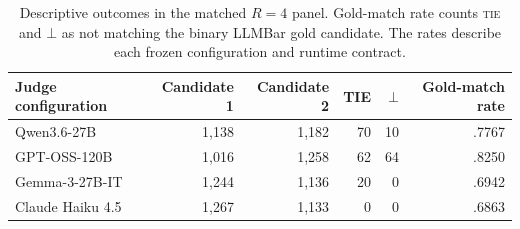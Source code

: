 \begin{table}[t]
\centering
\small
\setlength{\tabcolsep}{5pt}
\begin{tabular}{lrrrrr}
\toprule
Judge configuration & Candidate 1 & Candidate 2 & TIE & $\bot$ & Gold-match rate \\
\midrule
Qwen3.6-27B      & 1,138 & 1,182 & 70 & 10 & .7767 \\
GPT-OSS-120B     & 1,016 & 1,258 & 62 & 64 & .8250 \\
Gemma-3-27B-IT   & 1,244 & 1,136 & 20 & 0 & .6942 \\
Claude Haiku 4.5 & 1,267 & 1,133 & 0 & 0 & .6863 \\
\bottomrule
\end{tabular}
\caption{Descriptive outcomes in the matched $R=4$ panel. Gold-match rate
counts \textsc{tie} and $\bot$ as not matching the binary LLMBar gold
candidate. The rates describe each frozen configuration and runtime contract.}
\label{tab:cross-model-outcomes}
\end{table}
